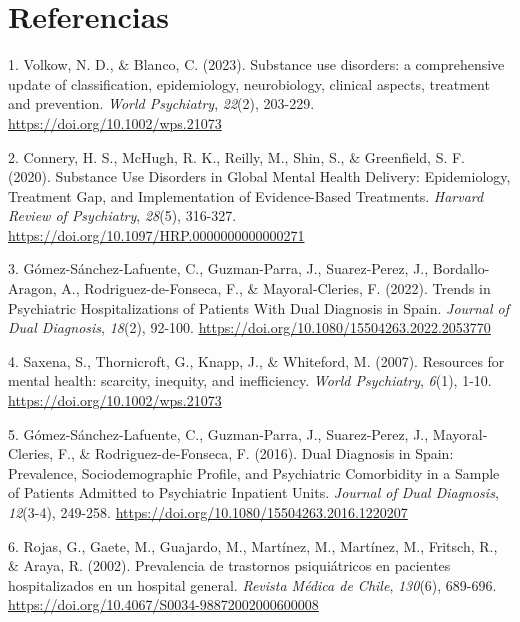 \documentclass[
  spanish,
  10pt,
]{article}
\newlength{\cslhangindent}
\newenvironment{CSLReferences}[2] %
 {\begin{list}{}{%
  \setlength{\itemindent}{0pt}
  \setlength{\leftmargin}{0pt}
  \setlength{\parsep}{0pt}
  \ifodd #1
   \setlength{\leftmargin}{\cslhangindent}
   \setlength{\itemindent}{-1\cslhangindent}
  \fi
  \setlength{\itemsep}{#2\baselineskip}}}
 {\end{list}}
\begin{document}
\newpage

\section*{Referencias}\label{bibliography}

\label{refs}
\begin{CSLReferences}{1}{0}
1. Volkow, N. D., \& Blanco, C. (2023). Substance use disorders: a
comprehensive update of classification, epidemiology, neurobiology,
clinical aspects, treatment and prevention. \emph{World Psychiatry},
\emph{22}(2), 203-229. \url{https://doi.org/10.1002/wps.21073}

2. Connery, H. S., McHugh, R. K., Reilly, M., Shin, S., \& Greenfield,
S. F. (2020). Substance Use Disorders in Global Mental Health Delivery:
Epidemiology, Treatment Gap, and Implementation of Evidence-Based
Treatments. \emph{Harvard Review of Psychiatry}, \emph{28}(5), 316-327.
\url{https://doi.org/10.1097/HRP.0000000000000271}

3. Gómez-Sánchez-Lafuente, C., Guzman-Parra, J., Suarez-Perez, J.,
Bordallo-Aragon, A., Rodriguez-de-Fonseca, F., \& Mayoral-Cleries, F.
(2022). Trends in Psychiatric Hospitalizations of Patients With Dual
Diagnosis in Spain. \emph{Journal of Dual Diagnosis}, \emph{18}(2),
92-100. \url{https://doi.org/10.1080/15504263.2022.2053770}

4. Saxena, S., Thornicroft, G., Knapp, J., \& Whiteford, M. (2007).
Resources for mental health: scarcity, inequity, and inefficiency.
\emph{World Psychiatry}, \emph{6}(1), 1-10.
\url{https://doi.org/10.1002/wps.21073}

5. Gómez-Sánchez-Lafuente, C., Guzman-Parra, J., Suarez-Perez, J.,
Mayoral-Cleries, F., \& Rodriguez-de-Fonseca, F. (2016). Dual Diagnosis
in Spain: Prevalence, Sociodemographic Profile, and Psychiatric
Comorbidity in a Sample of Patients Admitted to Psychiatric Inpatient
Units. \emph{Journal of Dual Diagnosis}, \emph{12}(3-4), 249-258.
\url{https://doi.org/10.1080/15504263.2016.1220207}

6. Rojas, G., Gaete, M., Guajardo, M., Martínez, M., Martínez, M.,
Fritsch, R., \& Araya, R. (2002). Prevalencia de trastornos
psiquiátricos en pacientes hospitalizados en un hospital general.
\emph{Revista M{é}dica de Chile}, \emph{130}(6), 689-696.
\url{https://doi.org/10.4067/S0034-98872002000600008}


\end{CSLReferences}
\end{document}

